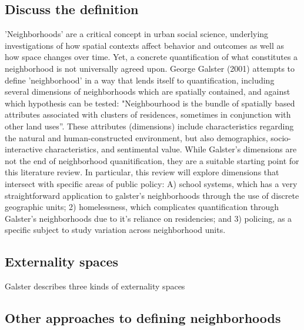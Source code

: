 \subsection{Discuss the definition}
'Neighborhoods' are a critical concept in urban social science,
underlying investigations of how spatial contexts affect behavior and
outcomes as well as how space changes over time. Yet, a concrete
quantification of what constitutes a neighborhood is not universally
agreed upon. George Galster (2001) attempts to define 'neighborhood'
in a way that lends itself to quantification, including several
dimensions of neighborhoods which are spatially contained, and against
which hypothesis can be tested: "Neighbourhood is the bundle of
spatially based attributes associated with clusters of residences,
sometimes in conjunction with other land uses”. These attributes
(dimensions) include characteristics regarding the natural and
human-constructed environment, but also demographics,
socio-interactive characteristics, and sentimental value. While
Galster's dimensions are not the end of neighborhood quanitification,
they are a suitable starting point for this literature review. In
particular, this review will explore dimensions that intersect with
specific areas of public policy: A) school systems, which has a very
straightforward application to galster's neighborhoods through the use
of discrete geographic units; 2) homelessness, which complicates
quantification through Galster's neighborhoods due to it's reliance on
residencies; and 3) policing, as a specific subject to study variation
across neighborhood units.

\subsection{Externality spaces}
Galster describes three kinds of externality spaces

\subsection{Other approaches to defining neighborhoods}

